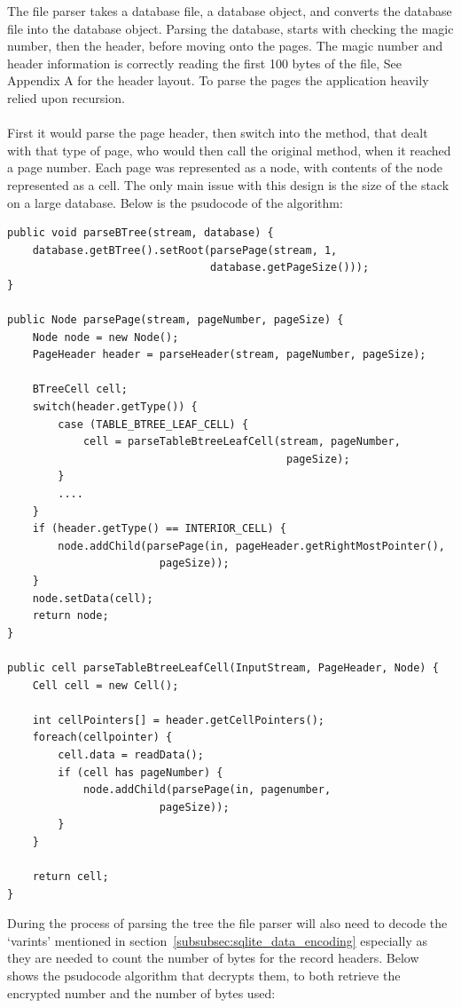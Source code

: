 The file parser takes a database file, a database object, and converts the database file into the database object. Parsing the database, starts with checking the magic number, then the header, before moving onto the pages. The magic number and header information is correctly reading the first 100 bytes of the file, See Appendix A for the header layout. To parse the pages the application heavily relied upon recursion.
\\\\
First it would parse the page header, then switch into the method, that dealt with that type of page, who would then call the original method, when it reached a page number.  Each page was represented as a node, with contents of the node represented as a cell. The only main issue with this design is the size of the stack on a large database. Below is the psudocode of the algorithm:

\begin{lstlisting}	
public void parseBTree(stream, database) {
	database.getBTree().setRoot(parsePage(stream, 1, 
								database.getPageSize()));
}

public Node parsePage(stream, pageNumber, pageSize) {
	Node node = new Node();
	PageHeader header = parseHeader(stream, pageNumber, pageSize);
	
	BTreeCell cell;
	switch(header.getType()) {
		case (TABLE_BTREE_LEAF_CELL) {
			cell = parseTableBtreeLeafCell(stream, pageNumber, 
											pageSize);
		}
		....
	}
	if (header.getType() == INTERIOR_CELL) {
		node.addChild(parsePage(in, pageHeader.getRightMostPointer(), 
						pageSize));
	}
	node.setData(cell);
	return node;
}

public cell parseTableBtreeLeafCell(InputStream, PageHeader, Node) {
	Cell cell = new Cell();
	
	int cellPointers[] = header.getCellPointers();
	foreach(cellpointer) {
		cell.data = readData();		
		if (cell has pageNumber) {
			node.addChild(parsePage(in, pagenumber, 
						pageSize));
		}
	}
	
	return cell;
}
\end{lstlisting}

During the process of parsing the tree the file parser will also need to decode the `varints' mentioned in section~\ref{subsubsec:sqlite_data_encoding} especially as they are needed to count the number of bytes for the record headers. Below shows the psudocode algorithm that decrypts them, to both retrieve the encrypted number and the number of bytes used: 

